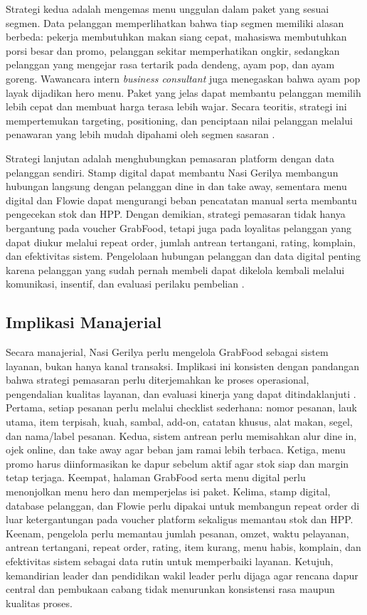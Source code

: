 Strategi kedua adalah mengemas menu unggulan dalam paket yang sesuai segmen. Data pelanggan memperlihatkan bahwa tiap segmen memiliki alasan berbeda: pekerja membutuhkan makan siang cepat, mahasiswa membutuhkan porsi besar dan promo, pelanggan sekitar memperhatikan ongkir, sedangkan pelanggan yang mengejar rasa tertarik pada dendeng, ayam pop, dan ayam goreng. Wawancara intern \textit{business consultant} juga menegaskan bahwa ayam pop layak dijadikan hero menu. Paket yang jelas dapat membantu pelanggan memilih lebih cepat dan membuat harga terasa lebih wajar. Secara teoritis, strategi ini mempertemukan targeting, positioning, dan penciptaan nilai pelanggan melalui penawaran yang lebih mudah dipahami oleh segmen sasaran \parencite{kotler2023principlesmarketing,sophia2025rendanggadih}.

Strategi lanjutan adalah menghubungkan pemasaran platform dengan data pelanggan sendiri. Stamp digital dapat membantu Nasi Gerilya membangun hubungan langsung dengan pelanggan dine in dan take away, sementara menu digital dan Flowie dapat mengurangi beban pencatatan manual serta membantu pengecekan stok dan HPP. Dengan demikian, strategi pemasaran tidak hanya bergantung pada voucher GrabFood, tetapi juga pada loyalitas pelanggan yang dapat diukur melalui repeat order, jumlah antrean tertangani, rating, komplain, dan efektivitas sistem. Pengelolaan hubungan pelanggan dan data digital penting karena pelanggan yang sudah pernah membeli dapat dikelola kembali melalui komunikasi, insentif, dan evaluasi perilaku pembelian \parencite{chaffey2022digitalmarketing,kotler2021marketingmanagement}.

\subsection{Implikasi Manajerial}
Secara manajerial, Nasi Gerilya perlu mengelola GrabFood sebagai sistem layanan, bukan hanya kanal transaksi. Implikasi ini konsisten dengan pandangan bahwa strategi pemasaran perlu diterjemahkan ke proses operasional, pengendalian kualitas layanan, dan evaluasi kinerja yang dapat ditindaklanjuti \parencite{wirtz2024servicesmarketing,david2023strategicmanagement}. Pertama, setiap pesanan perlu melalui checklist sederhana: nomor pesanan, lauk utama, item terpisah, kuah, sambal, add-on, catatan khusus, alat makan, segel, dan nama/label pesanan. Kedua, sistem antrean perlu memisahkan alur dine in, ojek online, dan take away agar beban jam ramai lebih terbaca. Ketiga, menu promo harus diinformasikan ke dapur sebelum aktif agar stok siap dan margin tetap terjaga. Keempat, halaman GrabFood serta menu digital perlu menonjolkan menu hero dan memperjelas isi paket. Kelima, stamp digital, database pelanggan, dan Flowie perlu dipakai untuk membangun repeat order di luar ketergantungan pada voucher platform sekaligus memantau stok dan HPP. Keenam, pengelola perlu memantau jumlah pesanan, omzet, waktu pelayanan, antrean tertangani, repeat order, rating, item kurang, menu habis, komplain, dan efektivitas sistem sebagai data rutin untuk memperbaiki layanan. Ketujuh, kemandirian leader dan pendidikan wakil leader perlu dijaga agar rencana dapur central dan pembukaan cabang tidak menurunkan konsistensi rasa maupun kualitas proses.
